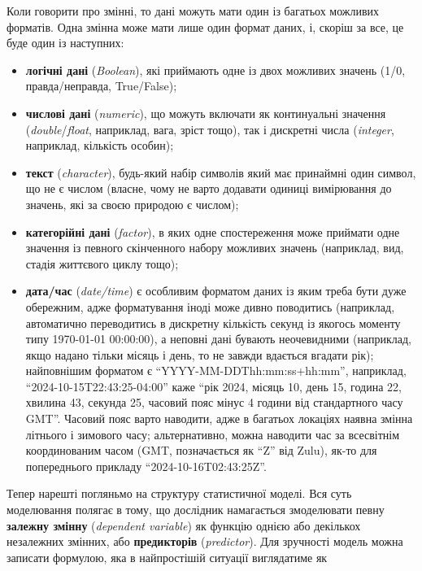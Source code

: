 \documentclass[
  11pt,
]{book}
\begin{document}
Коли говорити про змінні, то дані можуть мати один із багатьох можливих форматів. Одна змінна може мати лише один формат даних, і, скоріш за все, це буде один із наступних:

\begin{itemize}
\item
  \textbf{логічні дані} (\emph{Boolean}), які приймають одне із двох можливих значень (1/0, правда/неправда, True/False);
\item
  \textbf{числові дані} (\emph{numeric}), що можуть включати як континуальні значення (\emph{double}/\emph{float}, наприклад, вага, зріст тощо), так і дискретні числа (\emph{integer}, наприклад, кількість особин);
\item
  \textbf{текст} (\emph{character}), будь-який набір символів який має принаймні один символ, що не є числом (власне, чому не варто додавати одиниці вимірювання до значень, які за своєю природою є числом);
\item
  \textbf{категорійні дані} (\emph{factor}), в яких одне спостереження може приймати одне значення із певного скінченного набору можливих значень (наприклад, вид, стадія життєвого циклу тощо);
\item
  \textbf{дата/час} (\emph{date/time}) є особливим форматом даних із яким треба бути дуже обережним, адже форматування іноді може дивно поводитись (наприклад, автоматично переводитись в дискретну кількість секунд із якогось моменту типу 1970-01-01 00:00:00), а неповні дані бувають неочевидними (наприклад, якщо надано тільки місяць і день, то не завжди вдається вгадати рік); найповнішим форматом є ``YYYY-MM-DDThh:mm:ss+hh:mm'', наприклад, ``2024-10-15T22:43:25-04:00'' каже ``рік 2024, місяць 10, день 15, година 22, хвилина 43, секунда 25, часовий пояс мінус 4 години від стандартного часу GMT''. Часовий пояс варто наводити, адже в багатьох локаціях наявна змінна літнього і зимового часу; альтернативно, можна наводити час за всесвітнім координованим часом (GMT, позначається як ``Z'' від Zulu), як-то для попереднього прикладу ``2024-10-16T02:43:25Z''.
\end{itemize}

Тепер нарешті погляньмо на структуру статистичної моделі. Вся суть моделювання полягає в тому, що дослідник намагається змоделювати певну \textbf{залежну змінну} (\emph{dependent variable}) як функцію однією або декількох незалежних змінних, або \textbf{предикторів} (\emph{predictor}). Для зручності модель можна записати формулою, яка в найпростішій ситуації виглядатиме як
\end{document}
